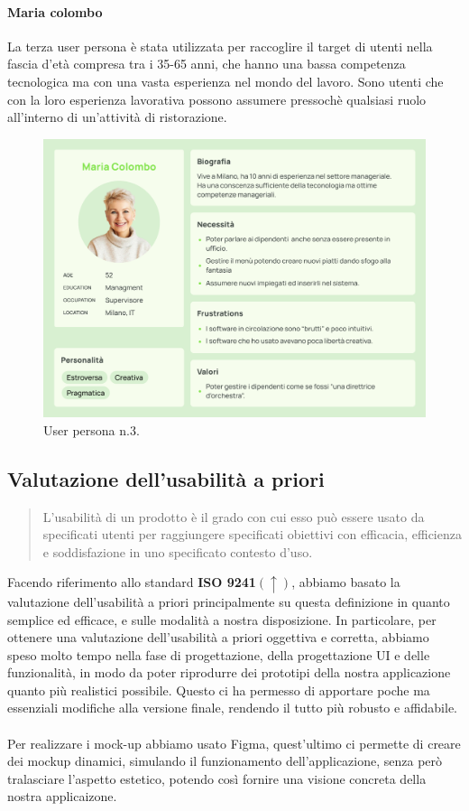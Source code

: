 \paragraph{Maria colombo}
La terza user persona è stata utilizzata per raccoglire il target di utenti nella fascia d'età compresa tra i 35-65 anni, che hanno una bassa competenza tecnologica ma con una vasta esperienza nel mondo del lavoro. Sono utenti che con la loro esperienza lavorativa possono assumere pressochè qualsiasi ruolo all'interno di un'attività di ristorazione.

\begin{figure}[H]
  \centering
  \includegraphics[scale=0.25]{img/personas/Maria_colombo_persona.png}
  \caption{User persona n.3.}
\end{figure}\newpage
\subsection{Valutazione dell'usabilità a priori}
\begin{quote}
  L'usabilità di un prodotto è il grado con cui esso può essere usato da specificati utenti per raggiungere specificati obiettivi con efficacia, efficienza e soddisfazione in uno specificato contesto d'uso.
\end{quote}
Facendo riferimento allo standard \textbf{ISO 9241}$(\uparrow)$, abbiamo basato la valutazione dell'usabilità a priori principalmente su questa definizione in quanto semplice ed efficace, e sulle modalità a nostra disposizione.
\newline
In particolare, per ottenere una valutazione dell'usabilità a priori oggettiva e corretta, abbiamo speso molto tempo nella fase di progettazione,  della progettazione UI
e delle funzionalità, in modo da poter riprodurre dei prototipi della nostra applicazione quanto più realistici possibile. Questo ci ha permesso di apportare poche ma essenziali modifiche alla versione finale, rendendo il tutto più robusto e affidabile.
\\
\\
Per realizzare i mock-up abbiamo usato Figma, quest'ultimo ci permette di
creare dei mockup dinamici, simulando il funzionamento dell'applicazione, senza però tralasciare l'aspetto estetico, potendo così fornire una visione concreta della nostra applicaizone.

